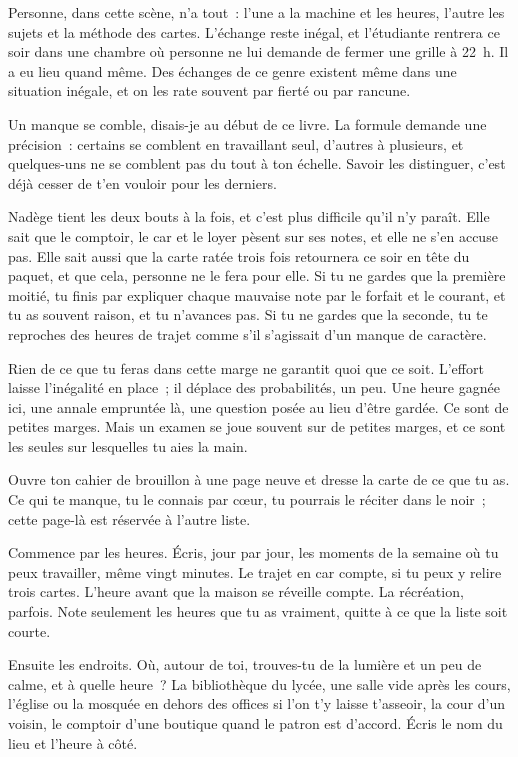 \documentclass[10.5pt,twoside,openright]{book}
\newcommand{\soustitre}[1]{\par\vspace{1.1em}\noindent{\bfseries\color{accent}#1}\par\vspace{0.4em}\noindent}
\begin{document}
Personne, dans cette scène, n’a tout : l’une a la machine et les heures, l’autre les sujets et la méthode des cartes. L’échange reste inégal, et l’étudiante rentrera ce soir dans une chambre où personne ne lui demande de fermer une grille à 22 h. Il a eu lieu quand même. Des échanges de ce genre existent même dans une situation inégale, et on les rate souvent par fierté ou par rancune.

Un manque se comble, disais-je au début de ce livre. La formule demande une précision : certains se comblent en travaillant seul, d’autres à plusieurs, et quelques-uns ne se comblent pas du tout à ton échelle. Savoir les distinguer, c’est déjà cesser de t’en vouloir pour les derniers.

Nadège tient les deux bouts à la fois, et c’est plus difficile qu’il n’y paraît. Elle sait que le comptoir, le car et le loyer pèsent sur ses notes, et elle ne s’en accuse pas. Elle sait aussi que la carte ratée trois fois retournera ce soir en tête du paquet, et que cela, personne ne le fera pour elle. Si tu ne gardes que la première moitié, tu finis par expliquer chaque mauvaise note par le forfait et le courant, et tu as souvent raison, et tu n’avances pas. Si tu ne gardes que la seconde, tu te reproches des heures de trajet comme s’il s’agissait d’un manque de caractère.

Rien de ce que tu feras dans cette marge ne garantit quoi que ce soit. L’effort laisse l’inégalité en place ; il déplace des probabilités, un peu. Une heure gagnée ici, une annale empruntée là, une question posée au lieu d’être gardée. Ce sont de petites marges. Mais un examen se joue souvent sur de petites marges, et ce sont les seules sur lesquelles tu aies la main.

\soustitre{Ce soir, essaie ceci}

Ouvre ton cahier de brouillon à une page neuve et dresse la carte de ce que tu as. Ce qui te manque, tu le connais par cœur, tu pourrais le réciter dans le noir ; cette page-là est réservée à l’autre liste.

Commence par les heures. Écris, jour par jour, les moments de la semaine où tu peux travailler, même vingt minutes. Le trajet en car compte, si tu peux y relire trois cartes. L’heure avant que la maison se réveille compte. La récréation, parfois. Note seulement les heures que tu as vraiment, quitte à ce que la liste soit courte.

Ensuite les endroits. Où, autour de toi, trouves-tu de la lumière et un peu de calme, et à quelle heure ? La bibliothèque du lycée, une salle vide après les cours, l’église ou la mosquée en dehors des offices si l’on t’y laisse t’asseoir, la cour d’un voisin, le comptoir d’une boutique quand le patron est d’accord. Écris le nom du lieu et l’heure à côté.
\end{document}
